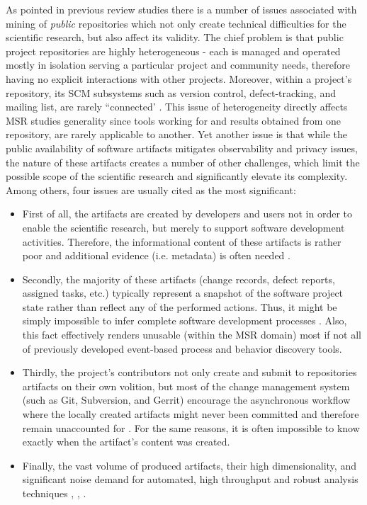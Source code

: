 As pointed in previous review studies \cite{citeulike:12550438} \cite{citeulike:7853299} \cite{citeulike:7465518} there
is a number of issues associated with mining of \textit{public} repositories which not only create technical difficulties for 
the scientific research, but also affect its validity. 
The chief problem is that public project repositories are highly heterogeneous - each is managed and operated 
mostly in isolation serving a particular project and community needs, therefore having no explicit interactions with 
other projects. 
Moreover, within a project's repository, its SCM subsystems such as version control, defect-tracking, and mailing list, 
are rarely ``connected'  \cite{citeulike:13058334}. 
This issue of heterogeneity directly affects MSR studies generality since tools working for and results obtained from 
one repository, are rarely applicable to another.
Yet another issue is that while the public availability of software artifacts mitigates observability and privacy issues, 
the nature of these artifacts creates a number of other challenges, which limit the possible scope of the scientific 
research and significantly elevate its complexity. Among others, four issues are usually cited as the most significant:
\begin{itemize}
 \item First of all, the artifacts are created by developers and users not in order to enable the scientific research,
but merely to support software development activities. Therefore, the informational content of these artifacts is rather 
poor and additional evidence (i.e. metadata) is often needed \cite{citeulike:342840} \cite{citeulike:7954249} 
\cite{citeulike:7260421}.
 \item Secondly, the majority of these artifacts (change records, defect reports, assigned tasks, etc.) 
typically represent a snapshot of the software project state rather than reflect any of the performed actions.
Thus, it might be simply impossible to infer complete software development processes \cite{citeulike:1296888}.
Also, this fact effectively renders unusable (within the MSR domain) most if not all of previously developed 
event-based process and behavior discovery tools.
 \item Thirdly, the project's contributors not only create and submit to repositories artifacts on their own volition,
but most of the change management system (such as Git, Subversion, and Gerrit) encourage the asynchronous workflow 
where the locally created artifacts might never been committed and therefore remain unaccounted for 
\cite{citeulike:2280690} \cite{citeulike:9037939}. 
For the same reasons, it is often impossible to know exactly when the artifact's content was created.
 \item Finally, the vast volume of produced artifacts, their high dimensionality, and significant noise demand 
 for automated, high throughput and robust analysis techniques 
 \cite{citeulike:12550438}, \cite{citeulike:7853299}, \cite{citeulike:4534888}.
\end{itemize}

